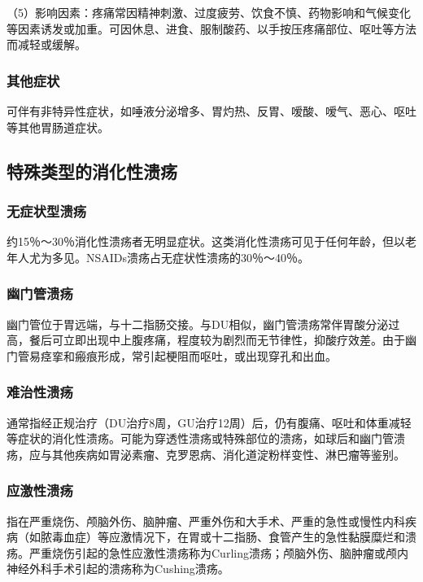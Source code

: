 （5）影响因素：疼痛常因精神刺激、过度疲劳、饮食不慎、药物影响和气候变化等因素诱发或加重。可因休息、进食、服制酸药、以手按压疼痛部位、呕吐等方法而减轻或缓解。

\subsubsection{其他症状}

可伴有非特异性症状，如唾液分泌增多、胃灼热、反胃、嗳酸、嗳气、恶心、呕吐等其他胃肠道症状。

\subsection{特殊类型的消化性溃疡}

\subsubsection{无症状型溃疡}

约15％～30％消化性溃疡者无明显症状。这类消化性溃疡可见于任何年龄，但以老年人尤为多见。NSAIDs溃疡占无症状性溃疡的30％～40％。

\subsubsection{幽门管溃疡}

幽门管位于胃远端，与十二指肠交接。与DU相似，幽门管溃疡常伴胃酸分泌过高，餐后可立即出现中上腹疼痛，程度较为剧烈而无节律性，抑酸疗效差。由于幽门管易痉挛和瘢痕形成，常引起梗阻而呕吐，或出现穿孔和出血。

\subsubsection{难治性溃疡}

通常指经正规治疗（DU治疗8周，GU治疗12周）后，仍有腹痛、呕吐和体重减轻等症状的消化性溃疡。可能为穿透性溃疡或特殊部位的溃疡，如球后和幽门管溃疡，应与其他疾病如胃泌素瘤、克罗恩病、消化道淀粉样变性、淋巴瘤等鉴别。

\subsubsection{应激性溃疡}

指在严重烧伤、颅脑外伤、脑肿瘤、严重外伤和大手术、严重的急性或慢性内科疾病（如脓毒血症）等应激情况下，在胃或十二指肠、食管产生的急性黏膜糜烂和溃疡。严重烧伤引起的急性应激性溃疡称为Curling溃疡；颅脑外伤、脑肿瘤或颅内神经外科手术引起的溃疡称为Cushing溃疡。

